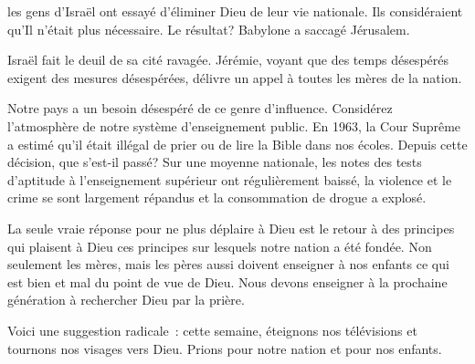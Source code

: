 




 les gens d'Israël ont essayé d'éliminer Dieu de leur vie nationale.
 Ils considéraient qu'Il n'était plus nécessaire.
 Le résultat? Babylone a saccagé Jérusalem. 

Israël fait le deuil de sa cité ravagée.
 Jérémie, voyant que des temps désespérés exigent des mesures
 désespérées, délivre un appel à toutes les mères de la nation. 


Notre pays a un besoin désespéré de ce genre d'influence.
 Considérez l'atmosphère de notre système d'enseignement public.
 En 1963, la Cour Suprême a estimé qu'il était illégal de prier
 ou de lire la Bible dans nos écoles.
 Depuis cette décision, que s'est-il passé?
 Sur une moyenne nationale, les notes des tests d'aptitude
 à l'enseignement supérieur ont régulièrement baissé,
 la violence et le crime se sont largement répandus
 et la consommation de drogue a explosé. 

La seule vraie réponse pour ne plus déplaire à Dieu
 est le retour à des principes qui plaisent à Dieu
 \ocadr ces principes sur lesquels notre nation a été fondée.
 Non seulement les mères, mais les pères aussi doivent enseigner
 à nos enfants ce qui est bien et mal \ocadr du point de vue de Dieu.
 Nous devons enseigner à la prochaine génération à rechercher Dieu
 par la prière. 

Voici une suggestion radicale~: cette semaine, éteignons nos télévisions
 et tournons nos visages vers Dieu.
 Prions pour notre nation et pour nos enfants. 

\dvrule



